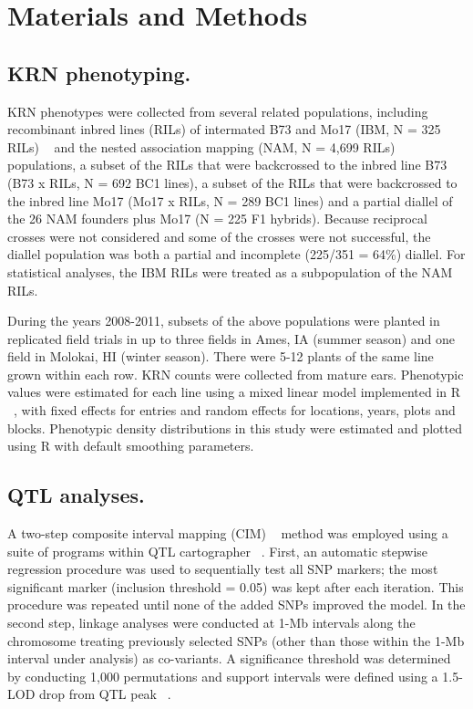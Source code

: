 \documentclass[10pt,letterpaper]{article}
\begin{document}

\section*{Materials and Methods}
\subsection*{KRN phenotyping.}

KRN phenotypes were collected from several related populations, including recombinant inbred lines (RILs) of intermated B73 and Mo17 (IBM, N = 325 RILs) ~\cite{Lee2002} and the nested association mapping (NAM, N = 4,699 RILs) ~\cite{Yu2008} populations, a subset of the RILs that were backcrossed to the inbred line B73 (B73 x RILs, N = 692 BC1 lines), a subset of the RILs that were backcrossed to the inbred line Mo17 (Mo17 x RILs, N = 289 BC1 lines) and a partial diallel of the 26 NAM founders plus Mo17 (N = 225 F1 hybrids). Because reciprocal crosses were not considered and some of the crosses were not successful, the diallel population was both a partial and incomplete (225/351 = 64\%) diallel. For statistical analyses, the IBM RILs were treated as a subpopulation of the NAM RILs.

During the years 2008-2011, subsets of the above populations were planted in replicated field trials in up to three fields in Ames, IA (summer season) and one field in Molokai, HI (winter season). There were 5-12 plants of the same line grown within each row. KRN counts were collected from mature ears. Phenotypic values were estimated for each line using a mixed linear model implemented in R ~\cite{DevelopmentCoreTeam2011}, with fixed effects for entries and random effects for locations, years, plots and blocks. Phenotypic density distributions in this study were estimated and plotted using R with default smoothing parameters. 

\subsection*{QTL analyses.}
A two-step composite interval mapping (CIM) ~\cite{Zeng1993} method was employed using a suite of programs within QTL cartographer ~\cite{DaCostaE.Silva2012}. First, an automatic stepwise regression procedure was used to sequentially test all SNP markers; the most significant marker (inclusion threshold = 0.05) was kept after each iteration. This procedure was repeated until none of the added SNPs improved the model. In the second step, linkage analyses were conducted at 1-Mb intervals along the chromosome treating previously selected SNPs (other than those within the 1-Mb interval under analysis) as co-variants. A significance threshold was determined by conducting 1,000 permutations and support intervals were defined using a 1.5-LOD drop from QTL peak ~\cite{Lander1989}.
\end{document}
